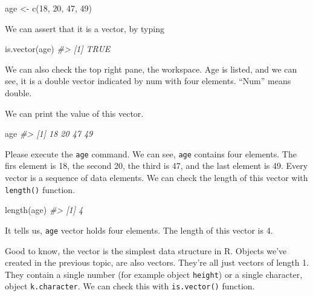 \documentclass[
]{book}
\newenvironment{Shaded}{\begin{snugshade}}{\end{snugshade}}
\newcommand{\CommentTok}[1]{\textcolor[rgb]{0.56,0.35,0.01}{\textit{#1}}}
\newcommand{\DecValTok}[1]{\textcolor[rgb]{0.00,0.00,0.81}{#1}}
\newcommand{\FunctionTok}[1]{\textcolor[rgb]{0.00,0.00,0.00}{#1}}
\newcommand{\NormalTok}[1]{#1}
\newcommand{\OtherTok}[1]{\textcolor[rgb]{0.56,0.35,0.01}{#1}}
\begin{document}
\begin{Shaded}
\begin{Highlighting}[]
\NormalTok{age }\OtherTok{\textless{}{-}} \FunctionTok{c}\NormalTok{(}\DecValTok{18}\NormalTok{, }\DecValTok{20}\NormalTok{, }\DecValTok{47}\NormalTok{, }\DecValTok{49}\NormalTok{)}
\end{Highlighting}
\end{Shaded}

We can assert that it is a vector, by typing

\begin{Shaded}
\begin{Highlighting}[]
\FunctionTok{is.vector}\NormalTok{(age)}
\CommentTok{\#\textgreater{} [1] TRUE}
\end{Highlighting}
\end{Shaded}

We can also check the top right pane, the workspace. Age is listed, and we can see, it is a double vector indicated by num with four elements. ``Num'' means double.

We can print the value of this vector.

\begin{Shaded}
\begin{Highlighting}[]
\NormalTok{age}
\CommentTok{\#\textgreater{} [1] 18 20 47 49}
\end{Highlighting}
\end{Shaded}

Please execute the \texttt{age} command. We can see, \texttt{age} contains four elements. The firs element is 18, the second 20, the third is 47, and the last element is 49. Every vector is a sequence of data elements. We can check the length of this vector with \texttt{length()} function.

\begin{Shaded}
\begin{Highlighting}[]
\FunctionTok{length}\NormalTok{(age)}
\CommentTok{\#\textgreater{} [1] 4}
\end{Highlighting}
\end{Shaded}

It tells us, \texttt{age} vector holds four elements. The length of this vector is 4.

Good to know, the vector is the simplest data structure in R. Objects we've created in the previous topic, are also vectors. They're all just vectors of length 1. They contain a single number (for example object \texttt{height}) or a single character, object \texttt{k.character}. We can check this with \texttt{is.vector()} function.
\end{document}
